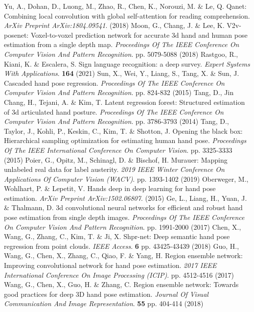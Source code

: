 \documentclass{article}
\begin{document}
\begin{thebibliography}{00}
Yu, A., Dohan, D., Luong, M., Zhao, R., Chen, K., Norouzi, M. \& Le, Q. Qanet: Combining local convolution with global self-attention for reading comprehension. {\em ArXiv Preprint ArXiv:1804.09541}. (2018)
Moon, G., Chang, J. \& Lee, K. V2v-posenet: Voxel-to-voxel prediction network for accurate 3d hand and human pose estimation from a single depth map. {\em Proceedings Of The IEEE Conference On Computer Vision And Pattern Recognition}. pp. 5079-5088 (2018)
Rastgoo, R., Kiani, K. \& Escalera, S. Sign language recognition: a deep survey. {\em Expert Systems With Applications}. \textbf{164} (2021)
Sun, X., Wei, Y., Liang, S., Tang, X. \& Sun, J. Cascaded hand pose regression. {\em Proceedings Of The IEEE Conference On Computer Vision And Pattern Recognition}. pp. 824-832 (2015)
Tang, D., Jin Chang, H., Tejani, A. \& Kim, T. Latent regression forest: Structured estimation of 3d articulated hand posture. {\em Proceedings Of The IEEE Conference On Computer Vision And Pattern Recognition}. pp. 3786-3793 (2014)
Tang, D., Taylor, J., Kohli, P., Keskin, C., Kim, T. \& Shotton, J. Opening the black box: Hierarchical sampling optimization for estimating human hand pose. {\em Proceedings Of The IEEE International Conference On Computer Vision}. pp. 3325-3333 (2015)
Poier, G., Opitz, M., Schinagl, D. \& Bischof, H. Murauer: Mapping unlabeled real data for label austerity. {\em 2019 IEEE Winter Conference On Applications Of Computer Vision (WACV)}. pp. 1393-1402 (2019)
Oberweger, M., Wohlhart, P. \& Lepetit, V. Hands deep in deep learning for hand pose estimation. {\em ArXiv Preprint ArXiv:1502.06807}. (2015)
Ge, L., Liang, H., Yuan, J. \& Thalmann, D. 3d convolutional neural networks for efficient and robust hand pose estimation from single depth images. {\em Proceedings Of The IEEE Conference On Computer Vision And Pattern Recognition}. pp. 1991-2000 (2017)
Chen, X., Wang, G., Zhang, C., Kim, T. \& Ji, X. Shpr-net: Deep semantic hand pose regression from point clouds. {\em IEEE Access}. \textbf{6} pp. 43425-43439 (2018)
Guo, H., Wang, G., Chen, X., Zhang, C., Qiao, F. \& Yang, H. Region ensemble network: Improving convolutional network for hand pose estimation. {\em 2017 IEEE International Conference On Image Processing (ICIP)}. pp. 4512-4516 (2017)
Wang, G., Chen, X., Guo, H. \& Zhang, C. Region ensemble network: Towards good practices for deep 3D hand pose estimation. {\em Journal Of Visual Communication And Image Representation}. \textbf{55} pp. 404-414 (2018)

\end{thebibliography}
\end{document}
